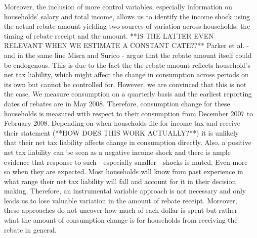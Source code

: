 Moreover, the inclusion of more control variables, especially information on households' salary and total income, allows us to identify the income shock using the actual rebate amount yielding two sources of variation across households: the timing of rebate receipt and the amount. **IS THE LATTER EVEN RELEVANT WHEN WE ESTIMATE A CONSTANT CATE??**
Parker et al. - and in the same line Misra and Surico - argue that the rebate amount itself could be endogenous. This is due to the fact the the rebate amount reflects household's net tax liability, which might affect the change in consumption across periods on its own but cannot be controlled for. However, we are convinced that this is not the case. We measure consumption on a quarterly basis and the earliest reporting dates of rebates are in May 2008. Therefore, consumption change for these households is measured with respect to their consumption from December 2007 to February 2008. Depending on when households file for income tax and receive their statement (**HOW DOES THIS WORK ACTUALLY?**) it is unlikely that their net tax liability affects change in consumption directly. Also, a positive net tax liability can be seen as a negative income shock and there is ample evidence that response to such - especially smaller - shocks is muted. Even more so when they are expected. Most households will know from past experience in what range their net tax liability will fall and account for it in their decision making. Therefore, an instrumental variable approach is not necessary and only leads us to lose valuable variation in the amount of rebate receipt. Moreover, these approaches do not uncover how much of each dollar is spent but rather what the amount of consumption change is for households from receiving the rebate in general.
